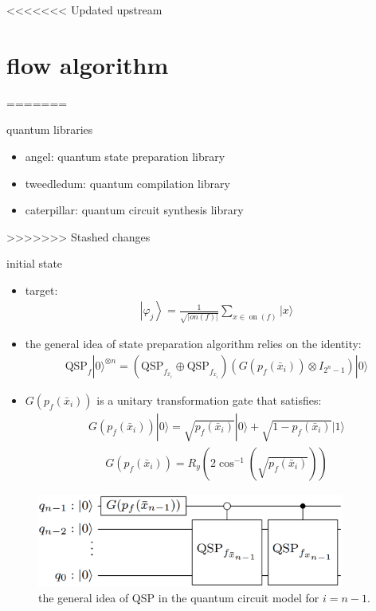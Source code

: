 <<<<<<< Updated upstream
\section{flow algorithm}
=======
\begin{frame}{quantum libraries}
  \begin{itemize}
    \item angel: quantum state preparation library
    \item tweedledum: quantum compilation library
    \item caterpillar: quantum circuit synthesis library
  \end{itemize}
\end{frame}
>>>>>>> Stashed changes
\begin{frame}{initial state }
    \begin{itemize}
      \item target:
      \begin{align}
        \left|\varphi_{j}\right\rangle= \frac{1}{\sqrt{|on(f)|}} \sum_{x \in \operatorname{on}(f)}|x\rangle
      \end{align}
      \item the  general  idea  of  state  preparation  algorithm  relies on the identity:
      \begin{align}
        \mathrm{QSP}_{f}|0\rangle^{\otimes n} = \left(\mathrm{QSP}_{f_{\bar{x}_{i}}} \oplus \mathrm{QSP}_{f_{x_{i}}}\right)\left(G\left(p_{f}\left(\bar{x}_{i}\right)\right) \otimes I_{2^{n}-1}\right)|0\rangle
      \end{align}
      \item $G\left(p_{f}\left(\bar{x}_{i}\right)\right)$ is a unitary transformation gate that satisfies:
      \begin{align}
        G(p_{f}\left(\bar{x}_{i}\right))|0\rangle = \sqrt{p_{f}\left(\bar{x}_{i}\right)}|0\rangle+\sqrt{1-p_{f}\left(\bar{x}_{i}\right)}|1\rangle
      \end{align}
      \begin{align}
        G\left(p_{f}\left(\bar{x}_{i}\right)\right) = R_{y}\left(2 \cos ^{-1}\left(\sqrt{p_{f}\left(\bar{x}_{i}\right)}\right)\right)
      \end{align}
    \end{itemize}
  \end{frame}
  \begin{frame}
    \begin{figure}[htbq]
      \centering
      \includegraphics[width=0.9\textwidth]{figure/QSP.png}
      \caption{the general idea of QSP in the quantum  circuit  model for $i=n-1$.} 
      \label{fig-qsp}
    \end{figure}
  \end{frame}

